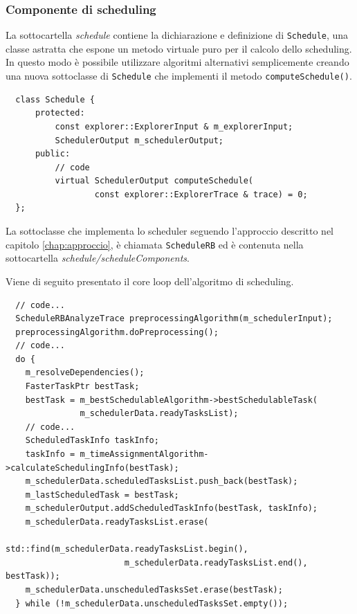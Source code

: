 \subsubsection{Componente di scheduling}
La sottocartella \emph{schedule} contiene la dichiarazione e definizione di
\verb+Schedule+, una classe astratta che espone un metodo virtuale puro per il 
calcolo dello scheduling. In questo modo è possibile utilizzare algoritmi 
alternativi semplicemente creando una nuova sottoclasse di 
\verb+Schedule+ che implementi il metodo \verb+computeSchedule()+.
\newline
\begin{verbatim}
  class Schedule {
      protected:
          const explorer::ExplorerInput & m_explorerInput;
          SchedulerOutput m_schedulerOutput;
      public:
          // code
          virtual SchedulerOutput computeSchedule(
                  const explorer::ExplorerTrace & trace) = 0;
  };
\end{verbatim}

La sottoclasse che implementa lo scheduler seguendo l'approccio descritto nel capitolo 
\ref{chap:approccio}, è chiamata \verb+ScheduleRB+ ed è contenuta nella 
sottocartella \emph{schedule/scheduleComponents}.

Viene di seguito presentato il core loop dell'algoritmo di scheduling.
\newline
\begin{verbatim}
  // code...
  ScheduleRBAnalyzeTrace preprocessingAlgorithm(m_schedulerInput);
  preprocessingAlgorithm.doPreprocessing();
  // code...
  do {
    m_resolveDependencies();
    FasterTaskPtr bestTask;
    bestTask = m_bestSchedulableAlgorithm->bestSchedulableTask(
               m_schedulerData.readyTasksList);
    // code...
    ScheduledTaskInfo taskInfo;
    taskInfo = m_timeAssignmentAlgorithm->calculateSchedulingInfo(bestTask);
    m_schedulerData.scheduledTasksList.push_back(bestTask);
    m_lastScheduledTask = bestTask;
    m_schedulerOutput.addScheduledTaskInfo(bestTask, taskInfo);
    m_schedulerData.readyTasksList.erase(
                        std::find(m_schedulerData.readyTasksList.begin(), 
                        m_schedulerData.readyTasksList.end(), bestTask));
    m_schedulerData.unscheduledTasksSet.erase(bestTask);
  } while (!m_schedulerData.unscheduledTasksSet.empty());
\end{verbatim}

